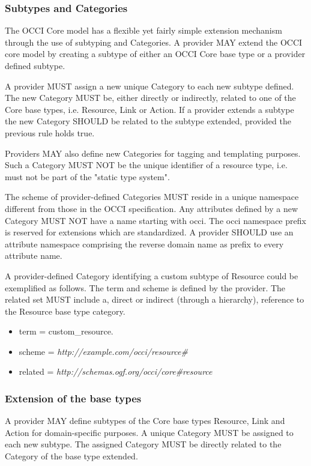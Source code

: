 \documentclass[10pt,a4paper]{article}
\begin{document}
\subsubsection{Subtypes and Categories}
The OCCI Core model has a flexible yet fairly simple extension mechanism through the use of subtyping and Categories.
A provider MAY extend the OCCI core model by creating a subtype of either an OCCI Core base type or a provider defined subtype.

A provider MUST assign a new unique Category to each new subtype defined. The new Category MUST be, either directly or indirectly, related to one of the Core base types, i.e. Resource, Link or Action. If a provider extends a subtype the new Category SHOULD be related to the subtype extended, provided the previous rule holds true.

Providers MAY also define new Categories for tagging and templating purposes. Such a Category MUST NOT be the unique identifier of a resource type, i.e. must not be part of the "static type system".

The scheme of provider-defined Categories MUST reside in a unique namespace different from those in the OCCI specification. Any attributes defined by a new Category MUST NOT have a name starting with occi. The occi namespace prefix is reserved for extensions which are standardized. A provider SHOULD use an attribute namespace comprising the reverse domain name as prefix to every attribute name.

A provider-defined Category identifying a custom subtype of Resource could be exemplified as follows. The term and scheme is defined by the provider. The related set MUST include a, direct or indirect (through a hierarchy), reference to the Resource base type category.

\begin{itemize}
\item term = custom\_resource.
\item scheme = \textit{http://example.com/occi/resource\#}
\item related = \textit{http://schemas.ogf.org/occi/core\#resource}
\end{itemize}

\subsubsection{Extension of the base types}
A provider MAY define subtypes of the Core base types Resource, Link and Action for domain-specific purposes. A unique Category MUST be assigned to each new subtype. The assigned Category MUST be directly related to the Category of the base type extended.
\end{document}
